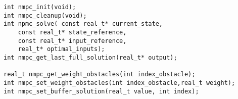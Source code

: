 \begin{lstlisting}[caption={Header file of the controller},label={lst:Header file of the controller}]
int nmpc_init(void);
int nmpc_cleanup(void);
int npmc_solve( const real_t* current_state,
	const real_t* state_reference,
	const real_t* input_reference,
	real_t* optimal_inputs);
int nmpc_get_last_full_solution(real_t* output);

real_t nmpc_get_weight_obstacles(int index_obstacle);
int nmpc_set_weight_obstacles(int index_obstacle,real_t weight);
int nmpc_set_buffer_solution(real_t value, int index); 
\end{lstlisting}